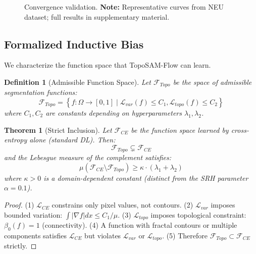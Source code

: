 \documentclass[12pt, a4paper]{article}
\newtheorem{theorem}{Theorem}
\newtheorem{definition}{Definition}
\newcommand{\calL}{\mathcal{L}}
\newcommand{\calF}{\mathcal{F}}
\begin{document}
\begin{figure}[h]
\centering
{}
\caption{Convergence validation. \textbf{Note:} Representative curves from NEU dataset; full results in supplementary material.}
\label{fig:convergence}
\end{figure}

\subsection{Formalized Inductive Bias}
\label{subsec:inductive_bias}

We characterize the function space that TopoSAM-Flow can learn.

\begin{definition}[Admissible Function Space]
\label{def:admissible}
Let $\calF_{Topo}$ be the space of admissible segmentation functions:
\begin{equation}
\calF_{Topo} = \left\{ f: \Omega \to [0,1] \mid \calL_{var}(f) \leq C_1, \calL_{topo}(f) \leq C_2 \right\}
\end{equation}
where $C_1, C_2$ are constants depending on hyperparameters $\lambda_1, \lambda_2$.
\end{definition}

\begin{theorem}[Strict Inclusion]
\label{thm:inclusion}
Let $\calF_{CE}$ be the function space learned by cross-entropy alone (standard DL). Then:
\begin{equation}
\calF_{Topo} \subsetneq \calF_{CE}
\end{equation}
and the Lebesgue measure of the complement satisfies:
\begin{equation}
\mu(\calF_{CE} \setminus \calF_{Topo}) \geq \kappa \cdot (\lambda_1 + \lambda_2)
\end{equation}
where $\kappa > 0$ is a domain-dependent constant (distinct from the SRH parameter $\alpha = 0.1$).
\end{theorem}

\begin{proof}
(1) $\calL_{CE}$ constrains only pixel values, not contours. (2) $\calL_{var}$ imposes bounded variation: $\int|\nabla f|dx \leq C_1/\mu$. (3) $\calL_{topo}$ imposes topological constraint: $\beta_0(f) = 1$ (connectivity). (4) A function with fractal contours or multiple components satisfies $\calL_{CE}$ but violates $\calL_{var}$ or $\calL_{topo}$. (5) Therefore $\calF_{Topo} \subset \calF_{CE}$ strictly.
\end{proof}
\end{document}
